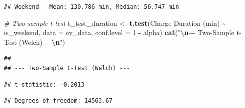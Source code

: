 \documentclass[
  12pt,
]{article}
\newenvironment{Shaded}{\begin{snugshade}}{\end{snugshade}}
\newcommand{\AttributeTok}[1]{\textcolor[rgb]{0.13,0.29,0.53}{#1}}
\newcommand{\CommentTok}[1]{\textcolor[rgb]{0.56,0.35,0.01}{\textit{#1}}}
\newcommand{\DecValTok}[1]{\textcolor[rgb]{0.00,0.00,0.81}{#1}}
\newcommand{\FunctionTok}[1]{\textcolor[rgb]{0.13,0.29,0.53}{\textbf{#1}}}
\newcommand{\NormalTok}[1]{#1}
\newcommand{\OtherTok}[1]{\textcolor[rgb]{0.56,0.35,0.01}{#1}}
\newcommand{\SpecialCharTok}[1]{\textcolor[rgb]{0.81,0.36,0.00}{\textbf{#1}}}
\newcommand{\StringTok}[1]{\textcolor[rgb]{0.31,0.60,0.02}{#1}}
\begin{document}
\begin{verbatim}
## Weekend - Mean: 130.786 min, Median: 56.747 min
\end{verbatim}

\begin{Shaded}
\begin{Highlighting}[]
\CommentTok{\# Two{-}sample t{-}test}
\NormalTok{t\_test\_duration }\OtherTok{\textless{}{-}} \FunctionTok{t.test}\NormalTok{(}\StringTok{\textasciigrave{}}\AttributeTok{Charge Duration (min)}\StringTok{\textasciigrave{}} \SpecialCharTok{\textasciitilde{}}\NormalTok{ is\_weekend,}
    \AttributeTok{data =}\NormalTok{ ev\_data, }\AttributeTok{conf.level =} \DecValTok{1} \SpecialCharTok{{-}}\NormalTok{ alpha)}
\FunctionTok{cat}\NormalTok{(}\StringTok{"}\SpecialCharTok{\textbackslash{}n}\StringTok{{-}{-}{-} Two{-}Sample t{-}Test (Welch) {-}{-}{-}}\SpecialCharTok{\textbackslash{}n}\StringTok{"}\NormalTok{)}
\end{Highlighting}
\end{Shaded}

\begin{verbatim}
## 
## --- Two-Sample t-Test (Welch) ---
\end{verbatim}

\begin{Shaded}
\end{Shaded}

\begin{verbatim}
## t-statistic: -0.2013
\end{verbatim}

\begin{Shaded}
\end{Shaded}

\begin{verbatim}
## Degrees of freedom: 14563.67
\end{verbatim}
\end{document}
